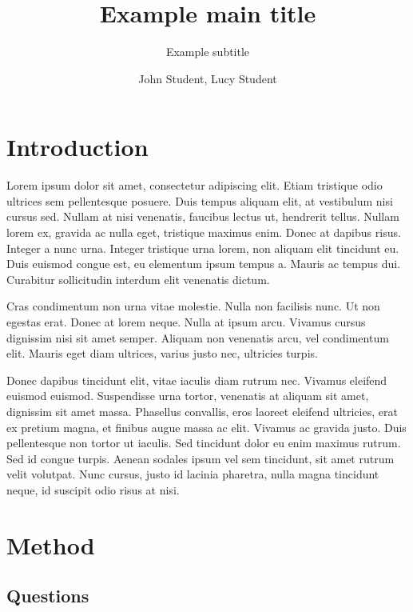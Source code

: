 \documentclass[11pt, a4paper]{resources/JTH}
\title{Example main title}
\subtitle{Example subtitle}
\author{John Student, Lucy Student}
\begin{document}
\maketitle

\tableofcontents

\newpage
{}
\section{Introduction}
\label{chap:introduction}
Lorem ipsum dolor sit amet, consectetur adipiscing elit. Etiam tristique odio ultrices sem pellentesque posuere. Duis tempus aliquam elit, at vestibulum nisi cursus sed. Nullam at nisi venenatis, faucibus lectus ut, hendrerit tellus. Nullam lorem ex, gravida ac nulla eget, tristique maximus enim. Donec at dapibus risus. Integer a nunc urna. Integer tristique urna lorem, non aliquam elit tincidunt eu. Duis euismod congue est, eu elementum ipsum tempus a. Mauris ac tempus dui. Curabitur sollicitudin interdum elit venenatis dictum\cite{davidson1996c}. 

Cras condimentum non urna vitae molestie. Nulla non facilisis nunc. Ut non egestas erat. Donec at lorem neque. Nulla at ipsum arcu. Vivamus cursus dignissim nisi sit amet semper. Aliquam non venenatis arcu, vel condimentum elit. Mauris eget diam ultrices, varius justo nec, ultricies turpis\cite{freeman2002example}.

Donec dapibus tincidunt elit, vitae iaculis diam rutrum nec. Vivamus eleifend euismod euismod. Suspendisse urna tortor, venenatis at aliquam sit amet, dignissim sit amet massa. Phasellus convallis, eros laoreet eleifend ultricies, erat ex pretium magna, et finibus augue massa ac elit. Vivamus ac gravida justo. Duis pellentesque non tortor ut iaculis. Sed tincidunt dolor eu enim maximus rutrum. Sed id congue turpis. Aenean sodales ipsum vel sem tincidunt, sit amet rutrum velit volutpat. Nunc cursus, justo id lacinia pharetra, nulla magna tincidunt neque, id suscipit odio risus at nisi\cite{zloof1977query}.

\section{Method}
\label{chap:Method}

\subsection{Questions}
\end{document}

